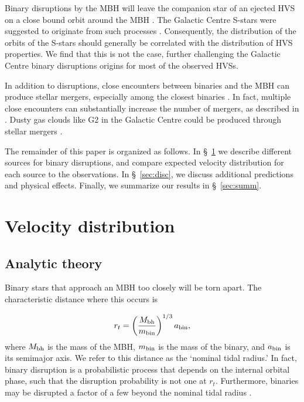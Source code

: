 \documentclass[fleqn,usenatbib]{mnras}
\begin{document}
Binary disruptions by the MBH will leave the companion star of an ejected HVS on a close bound orbit around the MBH \cite{hills1988}. The Galactic Centre S-stars were suggested to originate from such processes \citep{gou+03}. Consequently, the distribution of the orbits of the S-stars should generally be correlated with the distribution of HVS properties. We find that this is not the case, further challenging the Galactic Centre binary disruptions origins for most of the observed HVSs.       

In addition to disruptions, close encounters between binaries and the MBH can produce stellar mergers, especially among the closest binaries \citep{ginsburg&loeb2006}. In fact, multiple close encounters can substantially increase the number of mergers, as described in \citet{bradnick+2017}. Dusty gas clouds like G2 in the Galactic Centre \citep{gillessen+2012,gillessen+2013,ciurlo+2020} could be produced through stellar mergers \citep{prodan+2015}.

The remainder of this paper is organized as follows. In \S~\ref{sec:comp} we describe different sources for binary disruptions, and compare expected velocity distribution for each source to the observations. In \S~\ref{sec:disc}, we discuss additional predictions and physical effects. Finally, we summarize our results in \S~\ref{sec:summ}.


\section{Velocity distribution}
\label{sec:comp}
\subsection{Analytic theory}
\label{sec:analytic}
Binary stars that approach an MBH too closely will be torn apart. The characteristic distance where this occurs is 

\begin{equation}
    r_t=\left(\frac{M_{\rm bh}}{m_{\rm bin}}\right)^{1/3} a_{\rm bin},
\end{equation}
where $M_{\rm bh}$ is the mass of the MBH, $m_{\rm bin}$ is the mass of the binary, and $a_{\rm bin}$ is its semimajor axis. We refer to this distance as the `nominal tidal radius.' In fact, binary disruption is a probabilistic process that depends on the internal orbital phase, such that the disruption probability is not one at $r_t$. Furthermore, binaries may be disrupted a factor of a few beyond the nominal tidal radius \citep{hills1991,bromley+2006,sari+2010}.
\end{document}
